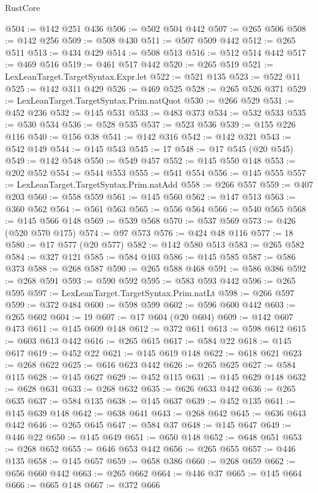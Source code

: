 \begin{lexlean}{RustCore}
\begin{coremodule}
@504 := @142 @251 @436
@506 := @502 @504 @442
@507 := @265 @506
@508 := @142 @256
@509 := @508 @430
@511 := @507 @509 @442
@512 := @265 @511
@513 := @434 @429
@514 := @508 @513
@516 := @512 @514 @442
@517 := @469 @516
@519 := @461 @517 @442
@520 := @265 @519
@521 := LexLeanTarget.TargetSyntax.Expr.let
@522 := @521 @135
@523 := @522 @11
@525 := @142 @311 @429
@526 := @469 @525
@528 := @265 @526 @371
@529 := LexLeanTarget.TargetSyntax.Prim.natQuot
@530 := @266 @529
@531 := @452 @236
@532 := @145 @531
@533 := @483 @373
@534 := @532 @533
@535 := @530 @534
@536 := @528 @535
@537 := @523 @536
@539 := @155 @226 @116
@540 := @156 @38
@541 := @142 @316
@542 := @142 @321
@543 := @542 @149
@544 := @145 @543
@545 := 17
@548 := @17 @545 (@20 @545)
@549 := @142 @548
@550 := @549 @457
@552 := @145 @550 @148
@553 := @202 @552
@554 := @544 @553
@555 := @541 @554
@556 := @145 @555
@557 := LexLeanTarget.TargetSyntax.Prim.natAdd
@558 := @266 @557
@559 := @407 @203
@560 := @558 @559
@561 := @145 @560
@562 := @147 @513
@563 := @360 @562
@564 := @561 @563
@565 := @556 @564
@566 := @540 @565
@568 := @145 @566 @148
@569 := @539 @568
@570 := @537 @569
@573 := @426 (@520 @570 @175)
@574 := @97 @573
@576 := @424 @48 @116
@577 := 18
@580 := @17 @577 (@20 @577)
@582 := @142 @580 @513
@583 := @265 @582
@584 := @327 @121
@585 := @584 @103
@586 := @145 @585
@587 := @586 @373
@588 := @268 @587
@590 := @265 @588 @468
@591 := @586 @386
@592 := @268 @591
@593 := @590 @592
@595 := @583 @593 @442
@596 := @265 @595
@597 := LexLeanTarget.TargetSyntax.Prim.natLt
@598 := @266 @597
@599 := @372 @484
@600 := @598 @599
@602 := @596 @600 @442
@603 := @265 @602
@604 := 19
@607 := @17 @604 (@20 @604)
@609 := @142 @607 @473
@611 := @145 @609 @148
@612 := @372 @611
@613 := @598 @612
@615 := @603 @613 @442
@616 := @265 @615
@617 := @584 @22
@618 := @145 @617
@619 := @452 @22
@621 := @145 @619 @148
@622 := @618 @621
@623 := @268 @622
@625 := @616 @623 @442
@626 := @265 @625
@627 := @584 @115
@628 := @145 @627
@629 := @452 @115
@631 := @145 @629 @148
@632 := @628 @631
@633 := @268 @632
@635 := @626 @633 @442
@636 := @265 @635
@637 := @584 @135
@638 := @145 @637
@639 := @452 @135
@641 := @145 @639 @148
@642 := @638 @641
@643 := @268 @642
@645 := @636 @643 @442
@646 := @265 @645
@647 := @584 @37
@648 := @145 @647
@649 := @446 @22
@650 := @145 @649
@651 := @650 @148
@652 := @648 @651
@653 := @268 @652
@655 := @646 @653 @442
@656 := @265 @655
@657 := @446 @135
@658 := @145 @657
@659 := @658 @386
@660 := @268 @659
@662 := @656 @660 @442
@663 := @265 @662
@664 := @446 @37
@665 := @145 @664
@666 := @665 @148
@667 := @372 @666

\end{coremodule}
\end{lexlean}
